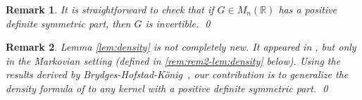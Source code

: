 \documentclass[a4paper, 11pt]{article}
\newtheorem{rem}{Remark}[thm]
\begin{document}
\vspace{.5em} \vspace{.3em} \begin{rem} \label{rem:rem1-lem:density}
It is straightforward to check that if $G\in M_n(\mathbb{R})$ has a positive definite symmetric part, then $G$ is invertible.
\qed
\end{rem}

\vspace{.3em} \begin{rem} \label{rem:notnew-lem:density}
Lemma \ref{lem:density} is not completely new. It appeared in \cite{av20}, but only in the Markovian setting (defined in \cref{rem:rem2-lem:density} below). Using the results derived by Brydges-Hofstad-König~\cite{bhk07},
our contribution is to generalize the density formula of \cite{av20} to any kernel with a positive definite symmetric part.
\qed
\end{rem}
\end{document}
